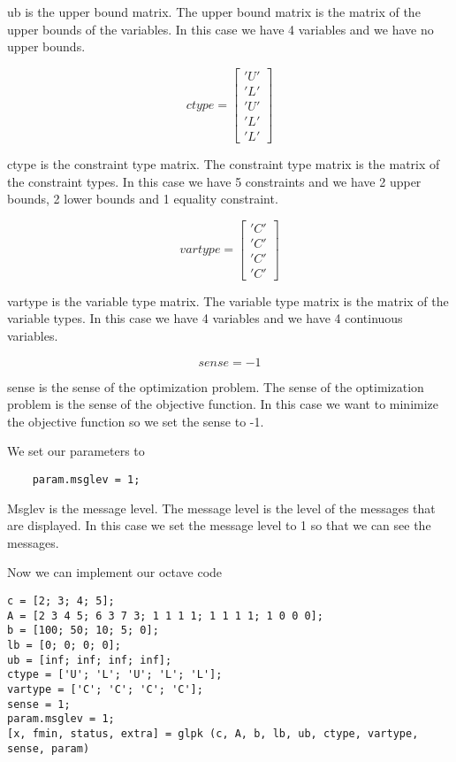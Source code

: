 ub is the upper bound matrix. The upper bound matrix is the matrix of the upper bounds of the variables. In this case we have 4 variables and we have no upper bounds.

\begin{equation}
ctype = \begin{bmatrix}
    'U' \\
    'L' \\
    'U' \\
    'L' \\
    'L'
\end{bmatrix}
\end{equation}

ctype is the constraint type matrix. The constraint type matrix is the matrix of the constraint types. In this case we have 5 constraints and we have 2 upper bounds, 2 lower bounds and 1 equality constraint.

\begin{equation}
vartype = \begin{bmatrix}
    'C' \\
    'C' \\
    'C' \\
    'C'
\end{bmatrix}
\end{equation}

vartype is the variable type matrix. The variable type matrix is the matrix of the variable types. In this case we have 4 variables and we have 4 continuous variables.

\begin{equation}
sense = -1
\end{equation}

sense is the sense of the optimization problem. The sense of the optimization problem is the sense of the objective function. In this case we want to minimize the objective function so we set the sense to -1.

We set our parameters to
\begin{verbatim}
    param.msglev = 1;
\end{verbatim}

Msglev is the message level. The message level is the level of the messages that are displayed. In this case we set the message level to 1 so that we can see the messages.

Now we can implement our octave code

\begin{verbatim}
c = [2; 3; 4; 5];
A = [2 3 4 5; 6 3 7 3; 1 1 1 1; 1 1 1 1; 1 0 0 0];
b = [100; 50; 10; 5; 0];
lb = [0; 0; 0; 0];
ub = [inf; inf; inf; inf];
ctype = ['U'; 'L'; 'U'; 'L'; 'L'];
vartype = ['C'; 'C'; 'C'; 'C'];
sense = 1;
param.msglev = 1;
[x, fmin, status, extra] = glpk (c, A, b, lb, ub, ctype, vartype, sense, param)
\end{verbatim}

